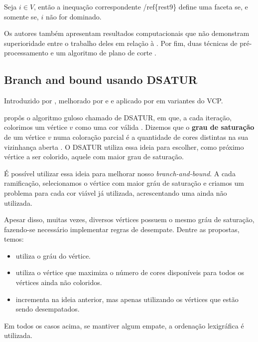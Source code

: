 \documentclass[11pt]{article}
\begin{document}
\begin{prep}
\textcite{Hansen2009Setcoveringpacking} Seja \(i \in V\), então a inequação correspondente /ref\{rest9\} define uma faceta se, e somente se, \(i\) não for dominado.
\end{prep}

Os autores também apresentam resultados computacionais que não demonstram superioridade entre o trabalho deles em relação à \textcite{Mehrotra1996ColumnGenerationApproach}.
Por fim, duas técnicas de pré-processamento e um algoritmo de plano de corte .
\subsection{Branch and bound usando DSATUR}
\label{sec:org7f8f79f}
Introduzido por \textcite{Brelaz1979Newmethodscolor}, melhorado por \textcite{Sewell1996improvedalgorithmexact} e \textcite{Segundo2012newDSATURbased} e aplicado por \textcite{MendezDiaz2015DSATURbasedalgorithm} em variantes do VCP.

\textcite{Brelaz1979Newmethodscolor} propôs o algoritmo guloso chamado de DSATUR, em que, a cada iteração, colorimos um vértice \(v\) como uma cor válida .
Dizemos que o \textbf{grau de saturação}  de um vértice \(v\) numa coloração parcial  é a quantidade de cores distintas na sua vizinhança aberta .
O DSATUR utiliza essa ideia para escolher, como próximo vértice a ser colorido, aquele com maior grau de saturação.

É possível utilizar essa ideia para melhorar nosso \emph{branch-and-bound}.
A cada ramificação, selecionamos o vértice com maior gráu de saturação e criamos um problema para cada cor viável já utilizada, acrescentando uma ainda não utilizada.

Apesar disso, muitas vezes, diversos vértices possuem o mesmo gráu de saturação, fazendo-se necessário implementar regras de desempate.
Dentre as propostas, temos:
\begin{itemize}
\item \textcite{Brelaz1979Newmethodscolor} utiliza o gráu do vértice.
\item \textcite{Sewell1996improvedalgorithmexact} utiliza o vértice que maximiza o número de cores disponíveis para todos os vértices ainda não coloridos.
\item \textcite{Segundo2012newDSATURbased} incrementa na ideia anterior, mas apenas utilizando os vértices que estão sendo desempatados.
\end{itemize}
Em todos os casos acima, se mantiver algum empate, a ordenação lexigráfica é utilizada.
\end{document}

